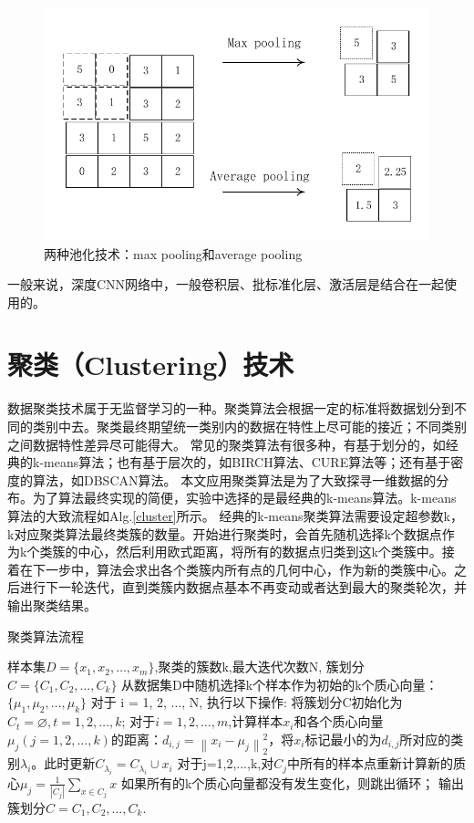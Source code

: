 \documentclass[ pdftex, oneside, master]{NJUthesis}
\begin{document}
\begin{figure}[h]
	\centering
	\includegraphics[width=0.7\linewidth]{pooling.pdf}  %
	\caption{两种池化技术：max pooling和average pooling}  %
	\label{pooling}   %
\end{figure}

一般来说，深度CNN网络中，一般卷积层、批标准化层、激活层是结合在一起使用的。

\section{聚类（Clustering）技术}
数据聚类技术属于无监督学习的一种。聚类算法会根据一定的标准将数据划分到不同的类别中去。聚类最终期望统一类别内的数据在特性上尽可能的接近；不同类别之间数据特性差异尽可能得大。
常见的聚类算法有很多种，有基于划分的，如经典的k-means算法；也有基于层次的，如BIRCH算法、CURE算法等；还有基于密度的算法，如DBSCAN算法。
本文应用聚类算法是为了大致探寻一维数据的分布。为了算法最终实现的简便，实验中选择的是最经典的k-means算法。k-means算法的大致流程如Alg.\ref{cluster}所示。
经典的k-means聚类算法需要设定超参数k，k对应聚类算法最终类簇的数量。开始进行聚类时，会首先随机选择k个数据点作为k个类簇的中心，然后利用欧式距离，将所有的数据点归类到这k个类簇中。接着在下一步中，算法会求出各个类簇内所有点的几何中心，作为新的类簇中心。之后进行下一轮迭代，直到类簇内数据点基本不再变动或者达到最大的聚类轮次，并输出聚类结果。


\begin{algorithm}
	\renewcommand{\algorithmicrequire}{\textbf{Input:}}
	\renewcommand{\algorithmicensure}{\textbf{Output:}}
	\caption{聚类算法流程}
	\label{cluster}
	\begin{algorithmic}[1]
		\REQUIRE 样本集$D=\{x_1,x_2,\dots,x_m\}$,聚类的簇数k,最大迭代次数N,
		\ENSURE 簇划分$C=\{C_1,C_2,\dots,C_k\}$
		\STATE 从数据集D中随机选择k个样本作为初始的k个质心向量： $\{μ_1,μ_2,\dots,μ_k\}$
		\STATE 对于 i = 1, 2, ${\ldots}$, N, 执行以下操作:
		\STATE \qquad 将簇划分C初始化为$C_t=\varnothing,t=1,2,\dots,k$;
		\STATE \qquad 对于$i=1,2,\dots,m$,计算样本$x_i$和各个质心向量$μ_j(j=1,2,\dots, k)$的距离：$d_{i,j}=\left\|x_i-μ_j\right\|_2^2$，将$x_i$标记最小的为$d_{i,j}$所对应的类别$λ_i$。此时更新$C_{λ_i}=C_{λ_i}∪{x_i}$
		\STATE \qquad 对于j=1,2,...,k,对$C_j$中所有的样本点重新计算新的质心$μ_j=\frac{1}{|C_j|}\sum_{x \in C_j}x$
		\STATE \qquad 如果所有的k个质心向量都没有发生变化，则跳出循环；
		\STATE 输出簇划分$C={C_1, C_2, \dots, C_k}$.
	\end{algorithmic}
\end{algorithm}
\end{document}
